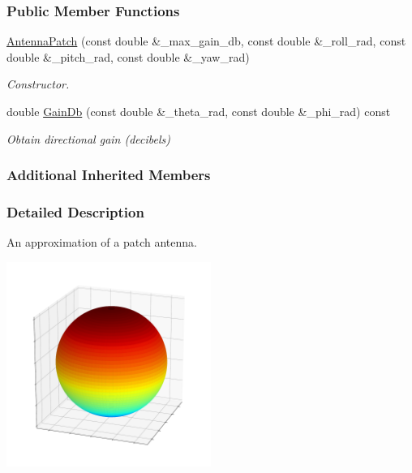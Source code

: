 \subsubsection*{Public Member Functions}
\begin{DoxyCompactItemize}
\item 
\hyperlink{classosse_1_1collaborate_1_1_antenna_patch_a317eea4be3b7de724dd8a3d3f83a975f}{Antenna\+Patch} (const double \&\+\_\+max\+\_\+gain\+\_\+db, const double \&\+\_\+roll\+\_\+rad, const double \&\+\_\+pitch\+\_\+rad, const double \&\+\_\+yaw\+\_\+rad)
\begin{DoxyCompactList}\small\item\em Constructor. \end{DoxyCompactList}\item 
double \hyperlink{classosse_1_1collaborate_1_1_antenna_patch_a34cd1ff37a5851f9dab72d737f72d0de}{Gain\+Db} (const double \&\+\_\+theta\+\_\+rad, const double \&\+\_\+phi\+\_\+rad) const
\begin{DoxyCompactList}\small\item\em Obtain directional gain (decibels) \end{DoxyCompactList}\end{DoxyCompactItemize}
\subsubsection*{Additional Inherited Members}


\subsubsection{Detailed Description}
An approximation of a patch antenna. 

 
\begin{DoxyImageNoCaption}
  \mbox{\includegraphics[width=0.5\textwidth]{patch}}
\end{DoxyImageNoCaption}


